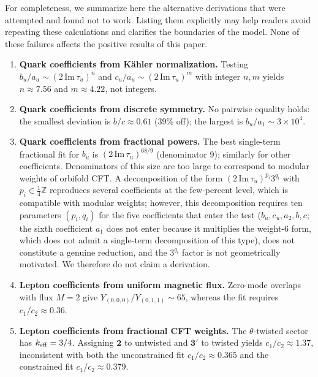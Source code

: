 \documentclass[12pt,a4paper]{article}
\numberwithin{equation}{section}
\begin{document}
For completeness, we summarize here the alternative derivations
that were attempted and found not to work. Listing them explicitly
may help readers avoid repeating these calculations and clarifies
the boundaries of the model. None of these failures affects
the positive results of this paper.

\begin{enumerate}[leftmargin=1.5em]
\item \textbf{Quark coefficients from Kähler normalization.}
Testing \(b_u/a_u \sim (2\,\text{Im}\,\tau_u)^n\) and
\(c_u/a_u \sim (2\,\text{Im}\,\tau_u)^m\) with integer \(n, m\)
yields \(n \approx 7.56\) and \(m \approx 4.22\), not integers.

\item \textbf{Quark coefficients from discrete symmetry.}
No pairwise equality holds: the smallest deviation is
\(b/c \approx 0.61\) (39\% off); the largest is \(b_u/a_1 \sim 3 \times 10^4\).

\item \textbf{Quark coefficients from fractional powers.}
The best single-term fractional fit for \(b_u\) is
\((2\,\text{Im}\,\tau_u)^{68/9}\) (denominator 9); similarly for
other coefficients. Denominators of this size are too large to
correspond to modular weights of orbifold CFT. A decomposition
of the form \((2\,\text{Im}\,\tau_u)^{p_i} 3^{q_i}\) with
\(p_i \in \frac{1}{4}\mathbb{Z}\) reproduces several coefficients
at the few-percent level, which is compatible with modular weights;
however, this decomposition requires ten parameters \((p_i, q_i)\)
for the five coefficients that enter the test (\(b_u, c_u, a_2, b, c\); the sixth coefficient \(a_1\) does not enter because it multiplies the weight-6 form, which does not admit a single-term decomposition of this type), does not constitute a genuine reduction,
and the \(3^{q_i}\) factor is not geometrically motivated. We
therefore do not claim a derivation.

\item \textbf{Lepton coefficients from uniform magnetic flux.}
Zero-mode overlaps with flux \(M=2\) give
\(Y_{(0,0,0)}/Y_{(0,1,1)} \sim 65\), whereas the fit requires
\(c_1/c_2 \approx 0.36\).

\item \textbf{Lepton coefficients from fractional CFT weights.}
The \(\theta\)-twisted sector has \(k_{\rm eff} = 3/4\). Assigning
\(\mathbf{2}\) to untwisted and \(\mathbf{3}'\) to twisted yields
\(c_1/c_2 \approx 1.37\), inconsistent with both the unconstrained
fit \(c_1/c_2 \approx 0.365\) and the constrained fit
\(c_1/c_2 \approx 0.379\).


\end{enumerate}
\end{document}
